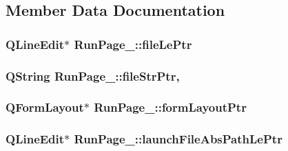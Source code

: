 \subsection{Member Data Documentation}
\hypertarget{class_run_page__2_adbe7177a28276ed683f9721e64974a9d}{
\subsubsection[{file\-Le\-Ptr}]{\setlength{\rightskip}{0pt plus 5cm}Q\-Line\-Edit$\ast$ Run\-Page\-\_\-::file\-Le\-Ptr\hspace{0.3cm}{\ttfamily [private]}}}\label{class_run_page__2_adbe7177a28276ed683f9721e64974a9d}
\hypertarget{class_run_page__2_a38819f2c591cbab6a3ab8d52d9d3c2c3}{
\subsubsection[{file\-Str\-Ptr}]{\setlength{\rightskip}{0pt plus 5cm}Q\-String Run\-Page\-\_\-::file\-Str\-Ptr\hspace{0.3cm}{\ttfamily [static]}, {\ttfamily [private]}}}\label{class_run_page__2_a38819f2c591cbab6a3ab8d52d9d3c2c3}
\hypertarget{class_run_page__2_a2a3b5601031396ce15de633630385e61}{
\subsubsection[{form\-Layout\-Ptr}]{\setlength{\rightskip}{0pt plus 5cm}Q\-Form\-Layout$\ast$ Run\-Page\-\_\-::form\-Layout\-Ptr\hspace{0.3cm}{\ttfamily [private]}}}\label{class_run_page__2_a2a3b5601031396ce15de633630385e61}
\hypertarget{class_run_page__2_a7478e3f884c84a636a547dba64abd2ca}{
\subsubsection[{launch\-File\-Abs\-Path\-Le\-Ptr}]{\setlength{\rightskip}{0pt plus 5cm}Q\-Line\-Edit$\ast$ Run\-Page\-\_\-::launch\-File\-Abs\-Path\-Le\-Ptr\hspace{0.3cm}{\ttfamily [private]}}}\label{class_run_page__2_a7478e3f884c84a636a547dba64abd2ca}
